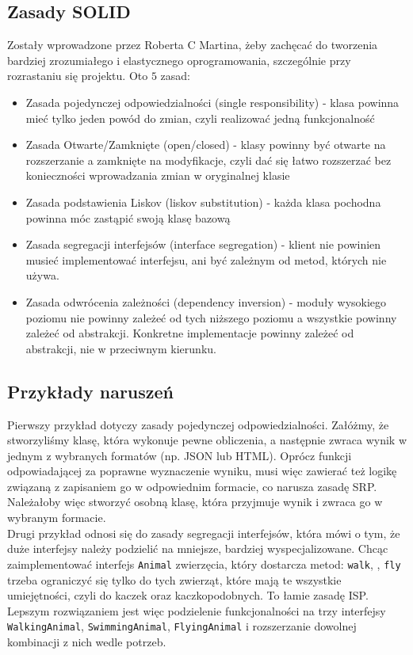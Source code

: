 \subsection{Zasady SOLID}
Zostały wprowadzone przez Roberta C Martina, żeby zachęcać do tworzenia bardziej zrozumiałego i elastycznego oprogramowania, szczególnie przy rozrastaniu się projektu. Oto \( 5 \) zasad:
\begin{itemize}
    \item Zasada pojedynczej odpowiedzialności (single responsibility) - klasa powinna mieć tylko jeden powód do zmian, czyli realizować jedną funkcjonalność
    \item Zasada Otwarte/Zamknięte (open/closed) - klasy powinny być otwarte na rozszerzanie a zamknięte na modyfikacje, czyli dać się łatwo rozszerzać bez konieczności wprowadzania zmian w oryginalnej klasie
    \item Zasada podstawienia Liskov (liskov substitution) - każda klasa pochodna powinna móc zastąpić swoją klasę bazową
    \item Zasada segregacji interfejsów (interface segregation) - klient nie powinien musieć implementować interfejsu, ani być zależnym od metod, których nie używa.
    \item Zasada odwrócenia zależności (dependency inversion) - moduły wysokiego poziomu nie powinny zależeć od tych niższego poziomu a wszystkie powinny zależeć od abstrakcji. Konkretne implementacje powinny zależeć od abstrakcji, nie w przeciwnym kierunku.
\end{itemize}

\subsection{Przykłady naruszeń}
Pierwszy przykład dotyczy zasady pojedynczej odpowiedzialności. Załóżmy, że stworzyliśmy klasę, która wykonuje pewne obliczenia, a następnie zwraca wynik w jednym z wybranych formatów (np. JSON lub HTML). Oprócz funkcji odpowiadającej za poprawne wyznaczenie wyniku, musi więc zawierać też logikę związaną z zapisaniem go w odpowiednim formacie, co narusza zasadę SRP. Należałoby więc stworzyć osobną klasę, która przyjmuje wynik i zwraca go w wybranym formacie. \\
Drugi przykład odnosi się do zasady segregacji interfejsów, która mówi o tym, że duże interfejsy należy podzielić na mniejsze, bardziej wyspecjalizowane. Chcąc zaimplementować interfejs \texttt{Animal} zwierzęcia, który dostarcza metod: \texttt{walk}, , \texttt{fly} trzeba ograniczyć się tylko do tych zwierząt, które mają te wszystkie umiejętności, czyli do kaczek oraz kaczkopodobnych. To łamie zasadę ISP. Lepszym rozwiązaniem jest więc podzielenie funkcjonalności na trzy interfejsy \texttt{WalkingAnimal}, \texttt{SwimmingAnimal}, \texttt{FlyingAnimal} i rozszerzanie dowolnej kombinacji z nich wedle potrzeb.